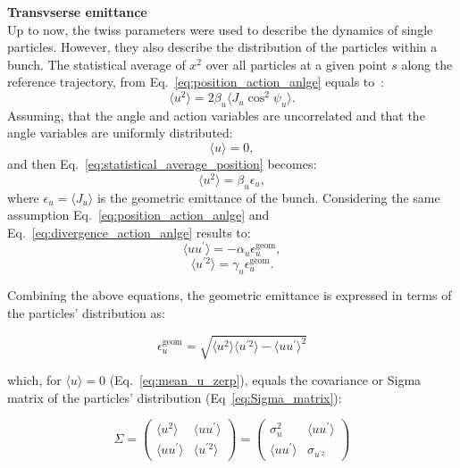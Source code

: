 \textbf{Transvserse emittance}\\
Up to now, the twiss parameters were used to describe the dynamics of single particles. However, they also describe the distribution of the particles within a bunch. The statistical average of $x^2$ over all particles at a given point $s$ along the reference trajectory, from Eq.~\eqref{eq:position_action_anlge} equals to~\cite{wolski2014}:
\begin{equation}\label{eq:statistical_average_position}
    \langle u^2 \rangle = 2 \beta_u \langle J_u \cos^2{\psi_u} \rangle.
\end{equation}
Assuming, that the angle and action variables are uncorrelated and that the angle variables are uniformly distributed: %
\begin{equation}\label{eq:mean_u_zerp}
    \langle u \rangle = 0,
\end{equation}
and then Eq.~\eqref{eq:statistical_average_position} becomes:
\begin{equation}\label{eq:emittance_definition_1}
    \langle u^2 \rangle = \beta_u \epsilon_u,
\end{equation}
where $\epsilon_u=\langle J_u \rangle$ is the geometric emittance of the bunch. Considering the same assumption Eq.~\eqref{eq:position_action_anlge} and  Eq.~\eqref{eq:divergence_action_anlge} results to:
\begin{equation}\label{eq:u_uprime_eq_1}
    \langle u u^\prime \rangle = - \alpha_u \epsilon^{\mathrm{geom}}_u,
\end{equation}
\begin{equation}\label{eq:u_uprime_eq_2}
    \langle u^{\prime 2} \rangle = \gamma_u \epsilon^{\mathrm{geom}}_u.
\end{equation}

Combining the above equations, the geometric emittance is expressed in terms of the particles' distribution as:

\begin{equation}\label{eq:geometric_emittance_v2}
    \epsilon^{\mathrm{geom}}_u = \sqrt{\langle u^2 \rangle \langle u^{\prime 2} \rangle- \langle u u^{\prime}\rangle ^2}
\end{equation}

which, for $\langle u \rangle=0$ (Eq.~\eqref{eq:mean_u_zerp}), equals the covariance or Sigma matrix of the particles' distribution (Eq~\eqref{eq:Sigma_matrix}):

\begin{equation}\label{eq:Sigma_matrix}
    \Sigma = \begin{pmatrix}
        \langle u^2 \rangle & \langle u u^\prime \rangle \\ 
        \langle u u^\prime \rangle & \langle u^{\prime 2} \rangle 
        \end{pmatrix}  = \begin{pmatrix}
            \sigma_u^2 & \langle u u^\prime \rangle \\ 
            \langle u u^\prime \rangle & \sigma_{u^{\prime 2}} 
            \end{pmatrix} 
\end{equation}


